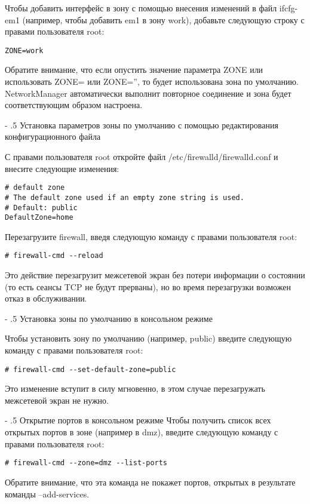 \documentclass[a4paper,10pt,twoside]{article}
\makeatletter
\renewcommand\paragraph{%
   \@startsection{paragraph}{4}{0mm}%
      {-\baselineskip}%
      {.5\baselineskip}%
      {\normalfont\normalsize\bfseries}}
\makeatother
\begin{document}
Чтобы добавить интерфейс в зону с помощью внесения изменений в файл ifcfg-em1 (например, чтобы добавить em1 в зону work), добавьте следующую строку с правами пользователя root: 
\begin{verbatim}
ZONE=work
\end{verbatim} 
Обратите внимание, что если опустить значение параметра ZONE или использовать ZONE= или ZONE='', то будет использована зона по умолчанию.
NetworkManager автоматически выполнит повторное соединение и зона будет соответствующим образом настроена.


\paragraph{Установка параметров зоны по умолчанию с помощью редактирования конфигурационного файла}

С правами пользователя root откройте файл /etc/firewalld/firewalld.conf и внесите следующие изменения:
\begin{verbatim}
# default zone
# The default zone used if an empty zone string is used.
# Default: public
DefaultZone=home
\end{verbatim} 

Перезагрузите firewall, введя следующую команду с правами пользователя root:  
\begin{verbatim}
# firewall-cmd --reload
\end{verbatim} 
Это действие перезагрузит межсетевой экран без потери информации о состоянии (то есть сеансы TCP не будут прерваны), но во время перезагрузки возможен отказ в обслуживании.


\paragraph{Установка зоны по умолчанию в консольном режиме}

Чтобы установить зону по умолчанию (например, public) введите следующую команду с правами пользователя root: 
\begin{verbatim}
# firewall-cmd --set-default-zone=public
\end{verbatim} 
Это изменение вступит в силу мгновенно, в этом случае перезагружать межсетевой экран не нужно.


\paragraph{Открытие портов в консольном режиме}
Чтобы получить список всех открытых портов в зоне (например в dmz), введите следующую команду с правами пользователя root: 
\begin{verbatim}
# firewall-cmd --zone=dmz --list-ports
\end{verbatim} 
Обратите внимание, что эта команда не покажет портов, открытых в результате команды --add-services.
\end{document}
